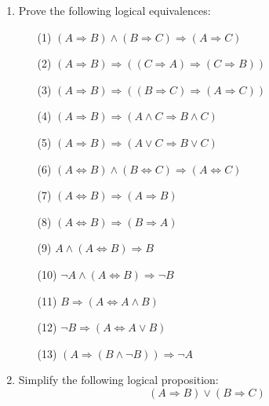 \documentclass[11pt,paper=b5,footinclude,headinclude]{scrbook} %
\theoremstyle{remark}
\theoremstyle{definition} %
\theoremstyle{theorem} %
\begin{document}
\begin{enumerate}[resume, label=\textbf{Problem \arabic*.}]
    \item Prove the following logical equivalences:
        \begin{itemize}
            \item[(1)] $(A \Rightarrow B) \land (B \Rightarrow C) \Rightarrow (A \Rightarrow C)$
            \item[(2)] $(A \Rightarrow B) \Rightarrow ((C \Rightarrow A) \Rightarrow (C \Rightarrow B))$
            \item[(3)] $(A \Rightarrow B) \Rightarrow ((B \Rightarrow C) \Rightarrow (A \Rightarrow C))$
            \item[(4)] $(A \Rightarrow B) \Rightarrow (A \land C \Rightarrow B \land C)$
            \item[(5)] $(A \Rightarrow B) \Rightarrow (A \lor C \Rightarrow B \lor C)$
            \item[(6)] $(A \Leftrightarrow B) \land (B \Leftrightarrow C) \Rightarrow (A \Leftrightarrow C)$
            \item[(7)] $(A \Leftrightarrow B) \Rightarrow (A \Rightarrow B)$
            \item[(8)] $(A \Leftrightarrow B) \Rightarrow (B \Rightarrow A)$
            \item[(9)] $A \land (A \Leftrightarrow B) \Rightarrow B$
            \item[(10)] $\neg A \land (A \Leftrightarrow B) \Rightarrow \neg B$
            \item[(11)] $B \Rightarrow (A \Leftrightarrow A \land B)$
            \item[(12)] $\neg B \Rightarrow (A \Leftrightarrow A \lor B)$
            \item[(13)] $(A \Rightarrow (B \land \neg B)) \Rightarrow \neg A$
        \end{itemize}
    \item Simplify the following logical proposition:
\[
(A \Rightarrow B) \lor (B \Rightarrow C)
\]

\end{enumerate}
\end{document}
